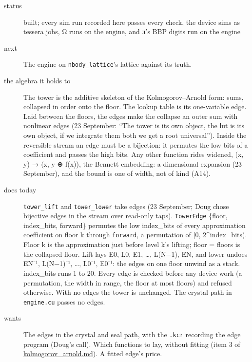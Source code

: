 \begin{description}
\item[{status}] built; every sim run recorded here passes every check, the device sims as tessera jobs, Ω runs on the engine, and π's BBP digits run on the engine
\item[{next}] The engine on \texttt{nbody\_\allowbreak{}lattice}'s lattice against its truth.
\end{description}

\begin{description}
\item[{the algebra it holds to}] The tower is the additive skeleton of the Kolmogorov–Arnold form: sums, collapsed in order onto the floor. The lookup table is its one-variable edge. Laid between the floors, the edges make the collapse an outer sum with nonlinear edges (23 September: “The tower is its own object, the lut is its own object, if we integrate them both we get a root universal”). Inside the reversible stream an edge must be a bijection: it permutes the low bits of a coefficient and passes the high bits. Any other function rides widened, (x, y) → (x, y ⊕ f(x)), the Bennett embedding: a dimensional expansion (23 September), and the bound is one of width, not of kind (A14).
\item[{does today}] \texttt{tower\_\allowbreak{}lift} and \texttt{tower\_\allowbreak{}lower} take edges (23 September; Doug chose bijective edges in the stream over read-only taps). \texttt{Tower\allowbreak{}Edge} \{floor, index\_\allowbreak{}bits, forward\} permutes the low index\_\allowbreak{}bits of every approximation coefficient on floor k through \texttt{forward}, a permutation of [0, 2\textasciicircum{}index\_\allowbreak{}bits). Floor k is the approximation just before level k's lifting; floor = floors is the collapsed floor. Lift lays E0, L0, E1, …, L(N−1), EN, and lower undoes EN⁻¹, L(N−1)⁻¹, …, L0⁻¹, E0⁻¹: the edges on one floor unwind as a stack. index\_\allowbreak{}bits runs 1 to 20. Every edge is checked before any device work (a permutation, the width in range, the floor at most floors) and refused otherwise. With no edges the tower is unchanged. The crystal path in \texttt{engine.\allowbreak{}cu} passes no edges.
\item[{wants}] The edges in the crystal and seal path, with the \texttt{.\allowbreak{}kcr} recording the edge program (Doug's call). Which functions to lay, without fitting (item 3 of \hyperref[chap:kolmogorov-arnold]{kolmogorov\_\allowbreak{}arnold.md}). A fitted edge's price.

\end{description}
